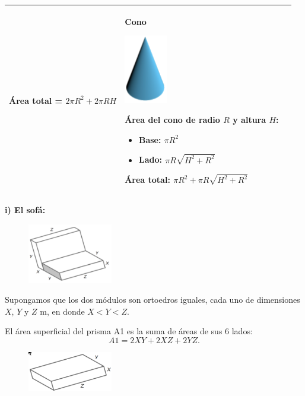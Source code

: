 \documentclass[12pt,a4paper]{article}
\begin{document}
\begin{center}
\begin{tabular}{|
	>{\centering\arraybackslash}m{4cm}|
	>{\centering\arraybackslash}m{4cm}|
	>{\centering\arraybackslash}m{4cm}|}
Área total = $2\pi R^2 + 2\pi RH$ &
\textbf{Cono}

\includegraphics[width=1.9cm]{Figuras/fig63.png}

Área del cono de radio $R$ y altura $H$:
\begin{itemize}[nosep]
    \item Base: $\pi R^2$
    \item Lado: $\pi R\sqrt{H^2 + R^2}$
\end{itemize}

Área total: $\pi R^2 + \pi R\sqrt{H^2 + R^2}$ & \\
\hline
\end{tabular}
\end{center}

\vspace{4mm}


\textbf{i) El sofá:}

\begin{figure}
\centering
\includegraphics[width=0.33\textwidth]{Figuras/fig67.png}
\end{figure}

Supongamos que los dos módulos son ortoedros iguales, cada uno de dimensiones $X$, $Y$ y $Z$ m, en donde $X < Y < Z$.

El área superficial del prisma A1 es la suma de áreas de sus 6 lados:
$$A1 = 2XY + 2XZ + 2YZ.$$

\begin{figure}
\centering
\includegraphics[width=0.33\textwidth]{Figuras/fig66.png}
\end{figure}
\end{document}

